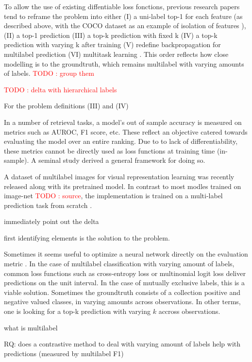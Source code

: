 \documentclass[sigconf,natbib,screen=true,review=true,anonymous]{acmart}
\newcommand\todo[1]{\textcolor{red}{TODO : #1}}
\begin{document}
To allow the use of existing diffentiable loss fonctions, previous research papers tend to reframe the problem into either (I) a uni-label top-1 for each feature (as described above, with the COCO dataset as an example of isolation of features \cite{COCO}), (II) a top-1 prediction (III) a top-k prediction with fixed k (IV) a top-k prediction with varying k after training (V) redefine backpropagation for multilabel prediction \cite{multilabelBackprop} (VI) multitask learning \cite{multitaskLabel}. This order reflects how close modelling is to the groundtruth, which remains multilabel with varying amounts of labels. \todo{group them}


\todo{delta with hierarchical labels}

For the problem definitions (III) and (IV)


In a number of retrieval tasks, a model's out of sample accuracy is measured on metrics such as AUROC, F1 score, etc. These reflect an objective catered towards evaluating the model over an entire ranking. Due to to lack of differentiability, these metrics cannot be directly used as loss functions at training time (in-sample). A seminal study \cite{optimizableLosses} derived a general framework for doing so. 

A dataset of multilabel images for visual representation learning was recently released along with its pretrained model. In contrast to most modles trained on image-net \todo{source}, the implementation is trained on a multi-label prediction task from scratch \cite{tencent}.

immediately point out the delta

first identifying elements is the solution to the problem.

Sometimes it seems useful to optimize a neural network directly on the evaluation metric \cite{optimizableLosses}. In the case of multilabel classification with varying amount of labels, common loss functions such as cross-entropy loss or multinomial logit loss deliver predictions on the unit interval. In the case of mutually exclusive labels, this is a viable solution. Sometimes the groundtruth consists of a collection positive and negative valued classes, in varying amounts across observations. In other terms, one is  looking for a top-k prediction with varying \(k\) accross observations.

what is multilabel

RQ: does a contrastive method to deal with varying amount of labels help with predictions (measured by multilabel F1)
\end{document}
